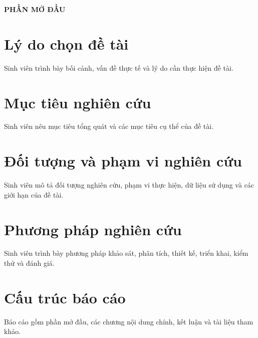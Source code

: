 
\vspace*{15pt}
\begin{center}
\large{\textbf{PHẦN MỞ ĐẦU}}
\end{center}

\section*{Lý do chọn đề tài}
Sinh viên trình bày bối cảnh, vấn đề thực tế và lý do cần thực hiện đề tài.

\section*{Mục tiêu nghiên cứu}
Sinh viên nêu mục tiêu tổng quát và các mục tiêu cụ thể của đề tài.

\section*{Đối tượng và phạm vi nghiên cứu}
Sinh viên mô tả đối tượng nghiên cứu, phạm vi thực hiện, dữ liệu sử dụng và các giới hạn của đề tài.

\section*{Phương pháp nghiên cứu}
Sinh viên trình bày phương pháp khảo sát, phân tích, thiết kế, triển khai, kiểm thử và đánh giá.

\section*{Cấu trúc báo cáo}
Báo cáo gồm phần mở đầu, các chương nội dung chính, kết luận và tài liệu tham khảo.


